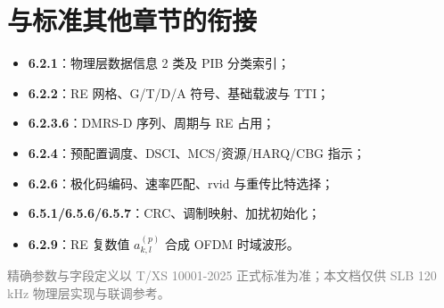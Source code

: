\documentclass[11pt,a4paper]{ctexart}
\begin{document}
\section{与标准其他章节的衔接}

\begin{itemize}[nosep]
  \item \textbf{6.2.1}：物理层数据信息 2 类及 PIB 分类索引；
  \item \textbf{6.2.2}：RE 网格、G/T/D/A 符号、基础载波与 TTI；
  \item \textbf{6.2.3.6}：DMRS-D 序列、周期与 RE 占用；
  \item \textbf{6.2.4}：预配置调度、DSCI、MCS/资源/HARQ/CBG 指示；
  \item \textbf{6.2.6}：极化码编码、速率匹配、$\mathrm{rvid}$ 与重传比特选择；
  \item \textbf{6.5.1/6.5.6/6.5.7}：CRC、调制映射、加扰初始化；
  \item \textbf{6.2.9}：RE 复数值 $a_{k,l}^{(p)}$ 合成 OFDM 时域波形。
\end{itemize}

\vfill
\begin{center}
\small\textcolor{gray}{精确参数与字段定义以 T/XS 10001-2025 正式标准为准；本文档仅供 SLB 120\,kHz 物理层实现与联调参考。}
\end{center}
\end{document}
